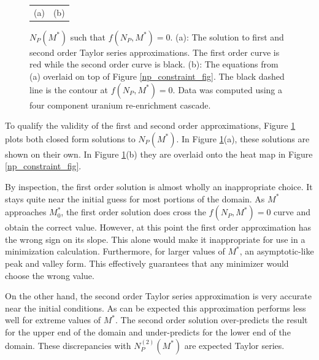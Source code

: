 \documentclass{ansconf}
\begin{document}
\begin{figure}[htpb]
\begin{center}
\begin{tabular}{cc}
(a) & (b) \\
\end{tabular}
\caption{$N_P(M^*)$ such that $f(N_P,M^*)=0$.  (a): The solution to first and 
second order Taylor series approximations.  The first order curve is red while the 
second order curve is black. (b): The equations from (a) overlaid on top of Figure 
\ref{np_constraint_fig}.  The black dashed line is the contour at $f(N_P, M^*)=0$. 
Data was computed using a four component uranium re-enrichment cascade.}
\label{np_closed_fig}
\end{center}
\end{figure}

To qualify the validity of the first and second order approximations, 
Figure \ref{np_closed_fig} plots both closed form solutions to $N_P(M^*)$.
In Figure \ref{np_closed_fig}(a), these solutions are shown on their own.
In Figure \ref{np_closed_fig}(b) they are overlaid onto the heat map in 
Figure \ref{np_constraint_fig}.  

By inspection, the first order solution is almost wholly an inappropriate choice.
It stays quite near the initial guess for most portions of the domain.  As $M^*$
approaches $M_0^*$, the first order solution does cross the $f(N_P, M^*)=0$ curve 
and obtain the correct value.  However, at this point the first order approximation 
has the wrong sign on its slope.  This alone would make it inappropriate for 
use in a minimization calculation.  Furthermore, for larger values of $M^*$, an 
asymptotic-like peak and valley form.  This effectively guarantees that any minimizer
would choose the wrong value.

On the other hand, the second order Taylor series approximation is very
accurate near the initial conditions.  As can be expected this approximation performs
less well for extreme values of $M^*$.  The second order solution over-predicts the 
result for the upper end of the domain and under-predicts for the lower end of the 
domain.  These discrepancies with $N_P^{(2)}(M^*)$ are expected Taylor series.
\end{document}

